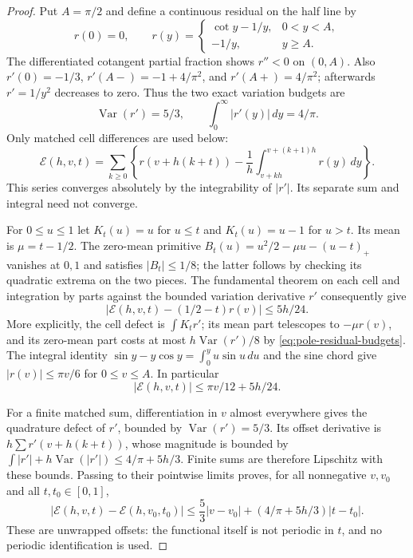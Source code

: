 \begin{proof}
Put $A=\pi/2$ and define a continuous residual on the half line by
\[
 r(0)=0,\qquad
 r(y)=\begin{cases}\cot y-1/y,&0<y<A,\\-1/y,&y\geq A.\end{cases}
\]
The differentiated cotangent partial fraction shows $r''<0$ on
$(0,A)$.  Also $r'(0)=-1/3$, $r'(A-)=-1+4/\pi^2$,
and $r'(A+)=4/\pi^2$; afterwards $r'=1/y^2$ decreases to zero.
Thus the two exact variation budgets are
\begin{equation}\label{eq:pole-residual-budgets}
 \operatorname{Var}(r')=5/3,\qquad
 \int_0^\infty|r'(y)|\,dy=4/\pi.
\end{equation}
Only matched cell differences are used below:
\[
 \mathcal E(h,v,t)=\sum_{k\geq0}
  \left\{r(v+h(k+t))-
       \frac1h\int_{v+kh}^{v+(k+1)h}r(y)\,dy\right\}.
\]
This series converges absolutely by the integrability of $|r'|$.
Its separate sum and integral need not converge.

For $0\leq u\leq1$ let $K_t(u)=u$ for $u\leq t$ and
$K_t(u)=u-1$ for $u>t$.  Its mean is $\mu=t-1/2$.
The zero-mean primitive
$B_t(u)=u^2/2-\mu u-(u-t)_+$ vanishes at $0,1$ and satisfies
$|B_t|\leq1/8$; the latter follows by checking its quadratic
extrema on the two pieces.
The fundamental theorem on each cell and integration by parts against
the bounded variation derivative $r'$ consequently give
\begin{equation}\label{eq:pole-residual-first-cell}
 |\mathcal E(h,v,t)-(1/2-t)r(v)|\leq5h/24.
\end{equation}
More explicitly, the cell defect is $\int K_t r'$; its mean part
telescopes to $-\mu r(v)$, and its zero-mean part costs at most
$h\operatorname{Var}(r')/8$ by \eqref{eq:pole-residual-budgets}.
The integral identity
$\sin y-y\cos y=\int_0^y u\sin u\,du$ and the sine chord give
$|r(v)|\leq\pi v/6$ for $0\leq v\leq A$.
In particular
\begin{equation}\label{eq:pole-residual-small-v}
 |\mathcal E(h,v,t)|\leq\pi v/12+5h/24.
\end{equation}

For a finite matched sum, differentiation in $v$ almost everywhere
gives the quadrature defect of $r'$, bounded by
$\operatorname{Var}(r')=5/3$.  Its offset derivative is
$h\sum r'(v+h(k+t))$, whose magnitude is bounded by
$\int|r'|+h\operatorname{Var}(|r'|)\leq4/\pi+5h/3$.
Finite sums are therefore Lipschitz with these bounds.  Passing to their
pointwise limits proves, for all nonnegative $v,v_0$ and all
$t,t_0\in[0,1]$,
\begin{equation}\label{eq:pole-residual-increments}
 |\mathcal E(h,v,t)-\mathcal E(h,v_0,t_0)|
 \leq\frac53|v-v_0|+(4/\pi+5h/3)|t-t_0|.
\end{equation}
These are unwrapped offsets: the functional itself is not periodic in
$t$, and no periodic identification is used.


\end{proof}
